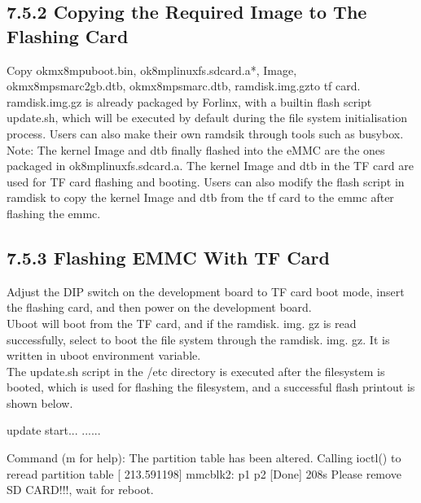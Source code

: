 \documentclass[letterpaper,10pt,openany,english]{sphinxmanual}
\begin{document}
\subsection{7.5.2 Copying the Required Image to The Flashing Card}
\label{\detokenize{linux-manual:copying-the-required-image-to-the-flashing-card}}
\sphinxAtStartPar
Copy ok\sphinxhyphen{}mx8mp\sphinxhyphen{}uboot.bin, ok8mp\sphinxhyphen{}linux\sphinxhyphen{}fs.sdcard.a*, Image, ok\sphinxhyphen{}mx8mp\sphinxhyphen{}smarc\sphinxhyphen{}2gb.dtb, ok\sphinxhyphen{}mx8mp\sphinxhyphen{}smarc.dtb, ramdisk.img.gzto tf card.\\
ramdisk.img.gz is already packaged by Forlinx, with a built\sphinxhyphen{}in flash script update.sh, which will be executed by default during the file system initialisation process. Users can also make their own ramdsik through tools such as busybox.\\
Note: The kernel Image and dtb finally flashed into the eMMC are the ones packaged in ok8mp\sphinxhyphen{}linux\sphinxhyphen{}fs.sdcard.a. The kernel Image and dtb in the TF card are used for TF card flashing and booting. Users can also modify the flash script in ramdisk to copy the kernel Image and dtb from the tf card to the emmc after flashing the emmc.


\subsection{7.5.3 Flashing EMMC With TF Card}
\label{\detokenize{linux-manual:flashing-emmc-with-tf-card}}
\sphinxAtStartPar
Adjust the DIP switch on the development board to TF card boot mode, insert the flashing card, and then power on the development board.\\
Uboot will boot from the TF card, and if the ramdisk. img. gz is read successfully, select to boot the file system through the ramdisk. img. gz. It is written in uboot environment variable.\\
The update.sh script in the /etc directory is executed after the filesystem is booted, which is used for flashing the filesystem, and a successful flash printout is shown below.

\begin{sphinxVerbatim}[commandchars=\\\{\}]
update start...
......

Command (m for help): The partition table has been altered.
Calling ioctl() to re\PYGZhy{}read partition table
[  213.591198]  mmcblk2: p1 p2
[Done] 208s
Please remove SD CARD!!!, wait for reboot.
\end{sphinxVerbatim}



\renewcommand{\indexname}{Index}
\printindex
\end{document}
